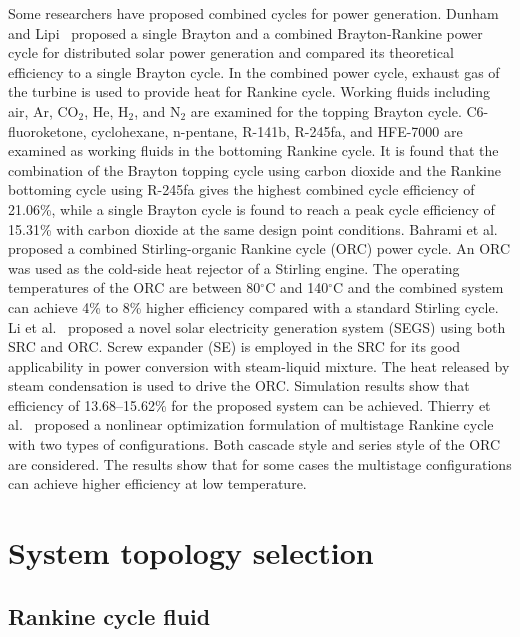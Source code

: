 Some researchers have proposed combined cycles for power generation. Dunham and Lipi~\cite{Dunham2013} proposed a single Brayton and a combined Brayton-Rankine power cycle for distributed solar power generation and compared its theoretical efficiency to a single Brayton cycle. In the combined power cycle, exhaust gas of the turbine is used to provide heat for Rankine cycle. Working fluids including air, Ar, CO$_2$, He, H$_2$, and N$_2$ are examined for the topping Brayton cycle. C6-fluoroketone, cyclohexane, n-pentane, R-141b, R-245fa, and HFE-7000 are examined as working fluids in the bottoming Rankine cycle. It is found that the combination of the Brayton topping cycle using carbon dioxide and the Rankine bottoming cycle using R-245fa gives the highest combined cycle efficiency of 21.06\%, while a single Brayton cycle is found to reach a peak cycle efficiency of 15.31\% with carbon dioxide at the same design point conditions. 
Bahrami et al.~\cite{Bahrami2013} proposed a combined Stirling-organic Rankine cycle (ORC) power cycle. An ORC was used as the cold-side heat rejector of a Stirling engine. The operating temperatures of the ORC are between 80$\mathrm{^\circ C}$ and 140$\mathrm{^\circ C}$ and the combined system can achieve 4\% to 8\% higher efficiency compared with a standard Stirling cycle.
Li et al.~\cite{Li2016a} proposed a novel solar electricity generation system (SEGS) using both SRC and ORC. Screw expander (SE) is employed in the SRC for its good applicability in power conversion with steam-liquid mixture. The heat released by steam condensation is used to drive the ORC. Simulation results show that efficiency of 13.68–15.62\% for the proposed system can be achieved.
Thierry et al.~\cite{Thierry2016} proposed a nonlinear optimization formulation of multistage Rankine cycle with two types of configurations. Both cascade style and series style of the ORC are considered. The results show that for some cases the multistage configurations can achieve higher efficiency at low temperature.

\section{System topology selection}
\label{sec:sts}
\subsection{Rankine cycle fluid}

